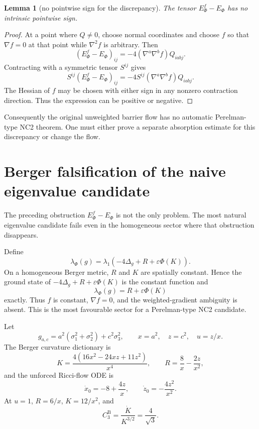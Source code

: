 \documentclass[11pt]{amsart}
\newtheorem{lemma}{Lemma}
\begin{document}
\begin{lemma}[no pointwise sign for the discrepancy]\label{lem:no-sign}
The tensor \(E_\Phi^f-E_\Phi\) has no intrinsic pointwise sign.
\end{lemma}

\begin{proof}
At a point where \(Q\ne0\), choose normal coordinates and choose \(f\) so that
\(\nabla f=0\) at that point while \(\nabla^2f\) is arbitrary.  Then
\[
        (E_\Phi^f-E_\Phi)_{ij}
        =
        -4(\nabla^a\nabla^b f)Q_{iabj}.
\]
Contracting with a symmetric tensor \(S^{ij}\) gives
\[
        S^{ij}(E_\Phi^f-E_\Phi)_{ij}
        =
        -4S^{ij}(\nabla^a\nabla^b f)Q_{iabj}.
\]
The Hessian of \(f\) may be chosen with either sign in any nonzero contraction
direction.  Thus the expression can be positive or negative.
\end{proof}

Consequently the original unweighted barrier flow has no automatic
Perelman-type NC2 theorem.  One must either prove a separate absorption
estimate for this discrepancy or change the flow.


\section{Berger falsification of the naive eigenvalue candidate}

The preceding obstruction \(E_\Phi^f-E_\Phi\) is not the only problem.  The
most natural eigenvalue candidate fails even in the homogeneous sector where
that obstruction disappears.

Define
\[
        \lambda_\Phi(g)
        =
        \lambda_1\!\left(-4\Delta_g+R+\varepsilon\Phi(K)\right).
\]
On a homogeneous Berger metric, \(R\) and \(K\) are spatially constant.  Hence
the ground state of \(-4\Delta_g+R+\varepsilon\Phi(K)\) is the constant
function and
\[
        \lambda_\Phi(g)=R+\varepsilon\Phi(K)
\]
exactly.  Thus \(f\) is constant, \(\nabla f=0\), and the weighted-gradient
ambiguity is absent.  This is the most favourable sector for a Perelman-type
NC2 candidate.

Let
\[
        g_{a,c}=a^2(\sigma_1^2+\sigma_2^2)+c^2\sigma_3^2,\qquad
        x=a^2,\quad z=c^2,\quad u=z/x .
\]
The Berger curvature dictionary is
\[
        K=\frac{4(16x^2-24xz+11z^2)}{x^4},\qquad
        R=\frac8x-\frac{2z}{x^2},
\]
and the unforced Ricci-flow ODE is
\[
        \dot x_0=-8+\frac{4z}{x},\qquad
        \dot z_0=-\frac{4z^2}{x^2}.
\]
At \(u=1\), \(R=6/x\), \(K=12/x^2\), and
\[
        C_3^{\mathrm B}
        =
        \frac{\dot K}{K^{3/2}}
        =
        \frac4{\sqrt3}.
\]
\end{document}
